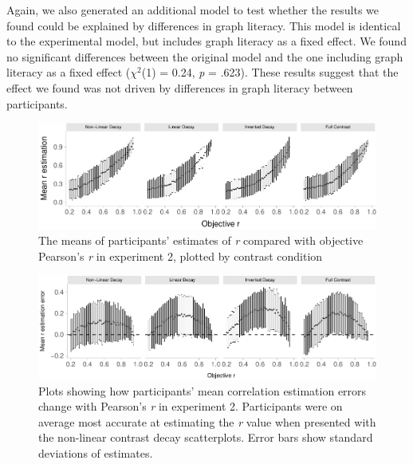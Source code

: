 \documentclass[preprint, 3p,
authoryear]{elsarticle} %
\begin{document}
Again, we also generated an additional model to test whether the results
we found could be explained by differences in graph literacy. This model
is identical to the experimental model, but includes graph literacy as a
fixed effect. We found no significant differences between the original
model and the one including graph literacy as a fixed effect
(\(\chi^2\)(1) = 0.24, \emph{p} = .623). These results suggest that the
effect we found was not driven by differences in graph literacy between
participants.

\begin{figure}

{\centering \includegraphics{contrast_and_scatterplots_files/figure-latex/e2-error-plot-1} 

}

\caption{\label{e2-error-plot}The means of participants' estimates of \textit{r} compared with objective Pearson's \textit{r} in experiment 2, plotted by contrast condition}\label{fig:e2-error-plot}
\end{figure}

\begin{figure}

{\centering \includegraphics{contrast_and_scatterplots_files/figure-latex/changes-with-r-e2-1} 

}

\caption{\label{e2-changes-plot}Plots showing how participants' mean correlation estimation errors change with Pearson's \textit{r} in experiment 2. Participants were on average most accurate at estimating the \textit{r} value when presented with the non-linear contrast decay scatterplots. Error bars show standard deviations of estimates.}\label{fig:changes-with-r-e2}
\end{figure}
\end{document}
